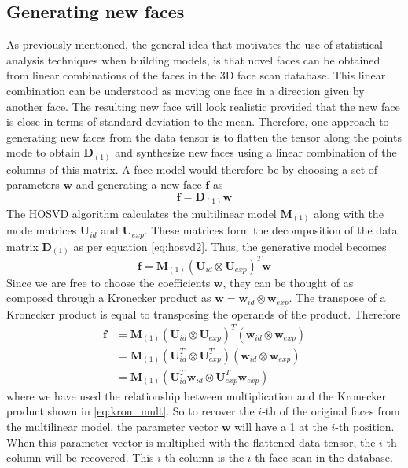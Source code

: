\documentclass[11pt,a4paper,twoside]{report}
\begin{document}
\subsection{Generating new faces}
As previously mentioned, the general idea that motivates the use of statistical
analysis techniques when building models, is that
novel faces can be obtained from linear combinations of the faces in the 3D
face scan database. This linear combination can be understood as moving one
face in a direction given by another face. The resulting new face will look realistic provided that the new face is close in terms of standard
deviation to the mean. Therefore, one approach to generating new faces from the
data tensor is to flatten the tensor along the points mode to obtain
$\mathbf{D}_{(1)}$ and synthesize new faces using a linear combination of the
columns of this matrix. A face model would therefore be by choosing a set of
parameters $\mathbf{w}$ and generating a new face $\mathbf{f}$ as 
\begin{equation}\label{eq:gen}
\mathbf{f} = \mathbf{D}_{(1)}\mathbf{w}
\end{equation}
The HOSVD algorithm calculates the multilinear model $\mathbf{M}_{(1)}$ along with the mode
matrices $\mathbf{U}_{id}$ and $\mathbf{U}_{exp}$. These matrices form the
decomposition of the data matrix $\mathbf{D}_{(1)}$ as per equation
\ref{eq:hosvd2}. Thus, the generative model becomes
\begin{equation}\label{eq:gen0.1}
\mathbf{f} = \mathbf{M}_{(1)}(\mathbf{U}_{id} \otimes \mathbf{U}_{exp})^T\mathbf{w}
\end{equation}
Since we are free to choose the coefficients $\mathbf{w}$, they can be
thought of as composed through a Kronecker product as $\mathbf{w} =
\mathbf{w}_{id} \otimes \mathbf{w}_{exp}$. The transpose of a Kronecker product
is equal to transposing the operands of the product. Therefore
\begin{align}\label{eq:gen1}
\mathbf{f} &= \mathbf{M}_{(1)}(\mathbf{U}_{id} \otimes
\mathbf{U}_{exp})^T(\mathbf{w}_{id} \otimes \mathbf{w}_{exp})\\
&=\mathbf{M}_{(1)}(\mathbf{U}_{id}^T \otimes
\mathbf{U}_{exp}^T)(\mathbf{w}_{id} \otimes \mathbf{w}_{exp})\\
\label{eq:gen2}
&= \mathbf{M}_{(1)}(\mathbf{U}_{id}^T\mathbf{w}_{id} \otimes
\mathbf{U}_{exp}^T\mathbf{w}_{exp})
\end{align}
where we have used the relationship between multiplication and the Kronecker
product shown in \ref{eq:kron_mult}. So to recover the $i$-th of the original faces
from the multilinear model, the parameter vector $\mathbf{w}$ will have a 1 at
the $i$-th position. When this parameter vector is multiplied with the flattened
data tensor, the $i$-th column will be recovered. This $i$-th column is the
$i$-th face scan in the database. 
\end{document}
